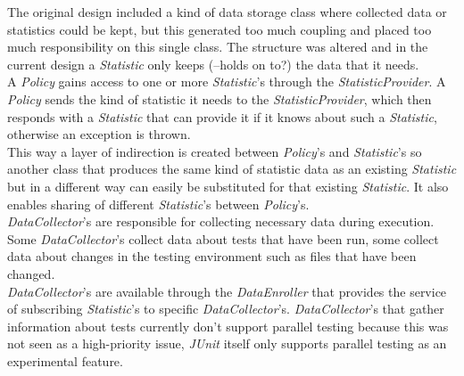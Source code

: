 \documentclass[i2]{oss}
\newcommand{\class}[1]{\emph{#1}}
\newcommand{\junit}{\emph{JUnit }}
\begin{document}
The original design included a kind of data storage class where collected
data or statistics could be kept, but this generated too much coupling
and placed too much responsibility on this single class.
The structure was altered and in the current design a \class{Statistic}
only keeps (--holds on to?) the data that it needs.\\

A \class{Policy} gains access to one or more \class{Statistic}'s through
the \class{StatisticProvider}.
A \class{Policy} sends the kind of statistic it needs to the 
\class{StatisticProvider}, which then responds with a \class{Statistic}
that can provide it if it knows about such a \class{Statistic}, otherwise
an exception is thrown.\\
This way a layer of indirection is created between \class{Policy}'s and
\class{Statistic}'s so another class that produces the same kind of 
statistic data as an existing \class{Statistic} but in a different way 
can easily be substituted for that existing \class{Statistic}. 
It also enables sharing of different \class{Statistic}'s between 
\class{Policy}'s. \\

\class{DataCollector}'s are responsible for collecting necessary data 
during execution.
Some \class{DataCollector}'s collect data about tests that have been run,
some collect data about changes in the testing environment such as files that have been changed.\\

\class{DataCollector}'s are available through the \class{DataEnroller}
that provides the service of subscribing \class{Statistic}'s to specific
\class{DataCollector}'s.
\class{DataCollector}'s that gather information about tests currently
don't support parallel testing because this was not seen as a 
high-priority issue, \junit itself only supports parallel testing as an
experimental feature.
\end{document}
